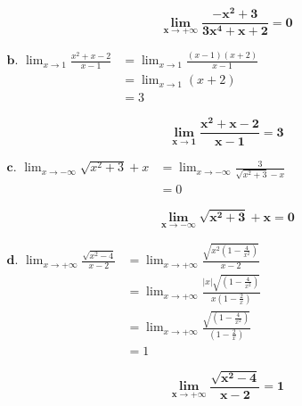 \documentclass[12pt,a4paper]{article}
\begin{document}
									  \begin{resultbox}
                        \[
                            \mathbf{\lim_{x \to +\infty} \frac{-x^2 + 3}{3x^4 + x + 2} = 0 }
                        \]
                    \end{resultbox}	

\(
\begin{aligned}
\textbf{b. } \lim_{x \to 1} \frac{x^2 + x - 2}{x - 1} & = \lim_{x \to 1} \frac{(x-1)(x+2)}{x - 1}\\
																											& = \lim_{x \to 1} (x+2)\\
																											& = 3
\end{aligned}
\)

									  \begin{resultbox}
                        \[
                            \mathbf{ \lim_{x \to 1} \frac{x^2 + x - 2}{x - 1} = 3 }
                        \]
                    \end{resultbox}	


\(
\begin{aligned}
\textbf{c. } \lim_{x \to -\infty} \sqrt{x^{2}+3}+x & =  \lim_{x \to -\infty} \frac{3}{\sqrt{x^{2}+3}-x}\\
& =  0
\end{aligned}
\)

									  \begin{resultbox}
                        \[
                            \mathbf{ \lim_{x \to -\infty} \sqrt{x^{2}+3}+x = 0 }
                        \]
                    \end{resultbox}	
                    
                    
\(
\begin{aligned}
\textbf{d. }\lim_{x \to +\infty} \frac{\sqrt{x^2 - 4}}{x - 2} & =  \lim_{x \to +\infty} \frac{\sqrt{x^2\left(1 - \frac{4}{x^{2}}\right)}}{x - 2}\\
& =  \lim_{x \to +\infty} \frac{|x|\sqrt{\left(1 - \frac{4}{x^{2}}\right)}}{x\left(1 - \frac{2}{x}\right)}\\
& =  \lim_{x \to +\infty} \frac{\sqrt{\left(1 - \frac{4}{x^{2}}\right)}}{\left(1 - \frac{2}{x}\right)}\\
& = 1
\end{aligned}
\)

									  \begin{resultbox}
                        \[
                            \mathbf{ \lim_{x \to +\infty} \frac{\sqrt{x^2 - 4}}{x - 2} = 1 }
                        \]
                    \end{resultbox}	
                    
\end{document}

